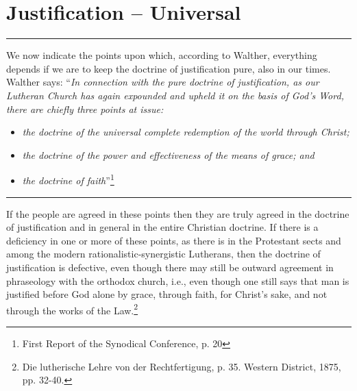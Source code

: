 \chapter{Justification -- Universal}

\hrule
\vspace{.30cm}
We now indicate the points upon which, according to Walther, everything depends if we are to keep the doctrine of justification pure, also in our times.  Walther says: “\textit{In connection with the pure doctrine of justification, as our Lutheran Church has again expounded and upheld it on the basis of God’s Word, there are chiefly three points at issue:}

\begin{itemize}
\item  \textit{the doctrine of the universal complete redemption of the world through Christ;}
\item  \textit{the doctrine of the power and effectiveness of the means of grace; and}
\item  \textit{the doctrine of faith}”\footnote{First Report of the Synodical Conference, p. 20}
\end{itemize}
\vspace{.30cm}
\hrule
\vspace{1.25cm}
If the people are agreed in these points then they are truly agreed in the doctrine of justification and in general in the entire Christian doctrine.  If there is a deficiency in one or more of these points, as there is in the Protestant sects and among the modern rationalistic-synergistic Lutherans, then the doctrine of justification is defective, even though there may still be outward agreement in phraseology with the orthodox church, i.e., even though one still says that man is justified before God alone by grace, through faith, for Christ’s sake, and not through the works of the Law.\footnote{Die lutherische Lehre von der Rechtfertigung, p. 35. Western District, 1875, pp. 32-40.}

